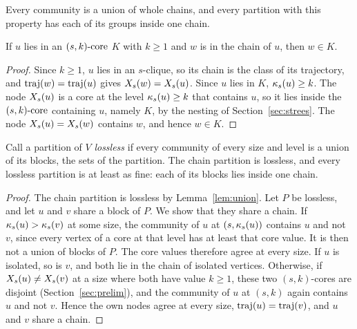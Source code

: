 Every community is a union of whole chains, and every partition with this property has each of its groups inside one chain.
\begin{lemma}\label{lem:union}
If $u$ lies in an $(s,k)\text{-core}$ $K$ with $k\ge1$ and $w$ is in the chain of $u$, then $w\in K$.
\end{lemma}
\begin{proof}
Since $k\ge1$, $u$ lies in an $s$-clique, so its chain is the class of its trajectory, and $\mathrm{traj}(w)=\mathrm{traj}(u)$ gives $X_{s}(w)=X_{s}(u)$.
%
Since $u$ lies in $K$, $\kappa_{s}(u)\ge k$.
%
The node $X_{s}(u)$ is a core at the level $\kappa_{s}(u)\ge k$ that contains $u$, so it lies inside the $(s,k)\text{-core}$ containing $u$, namely $K$, by the nesting of Section~\ref{sec:strees}.
%
The node $X_{s}(u)=X_{s}(w)$ contains $w$, and hence $w\in K$.
\end{proof}
\begin{proposition}\label{prop:coarsest}
Call a partition of $V$ \textit{lossless} if every community of every size and level is a union of its blocks, the sets of the partition.
%
The chain partition is lossless, and every lossless partition is at least as fine: each of its blocks lies inside one chain.
\end{proposition}
\begin{proof}
The chain partition is lossless by Lemma~\ref{lem:union}.
%
Let $P$ be lossless, and let $u$ and $v$ share a block of $P$.
%
We show that they share a chain.
%
If $\kappa_{s}(u)>\kappa_{s}(v)$ at some size, the community of $u$ at $(s,\kappa_{s}(u))$ contains $u$ and not $v$, since every vertex of a core at that level has at least that core value.
%
It is then not a union of blocks of $P$.
%
The core values therefore agree at every size.
%
If $u$ is isolated, so is $v$, and both lie in the chain of isolated vertices.
%
Otherwise, if $X_{s}(u)\ne X_{s}(v)$ at a size where both have value $k\ge1$, these two $(s,k)$-cores are disjoint (Section~\ref{sec:prelim}), and the community of $u$ at $(s,k)$ again contains $u$ and not $v$.
%
Hence the own nodes agree at every size, $\mathrm{traj}(u)=\mathrm{traj}(v)$, and $u$ and $v$ share a chain.
\end{proof}

